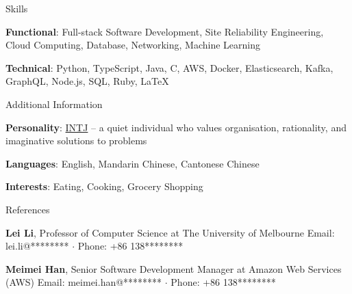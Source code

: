 \documentclass{xsha}
\begin{document}
\begin{xsection}{Skills}
\item \textbf{Functional}: Full-stack Software Development, Site Reliability Engineering, Cloud Computing, Database, Networking, Machine Learning
\item \textbf{Technical}: Python, TypeScript, Java, C, AWS, Docker, Elasticsearch, Kafka, GraphQL, Node.js, SQL, Ruby, \LaTeX
\end{xsection}

\begin{xsection}{Additional Information}
\item \textbf{Personality}: \href{https://www.16personalities.com/intj-personality}{INTJ} -- a quiet individual who values organisation, rationality, and imaginative solutions to problems
\item \textbf{Languages}: English, Mandarin Chinese, Cantonese Chinese
\item \textbf{Interests}: Eating, Cooking, Grocery Shopping
\end{xsection}

\begin{xsection}{References}
\item \textbf{Lei Li}, Professor of Computer Science at The University of Melbourne \newline
Email: lei.li@******** $\cdot$ Phone: +86 138********
\item \textbf{Meimei Han}, Senior Software Development Manager at Amazon Web Services (AWS) \newline
Email: meimei.han@******** $\cdot$ Phone: +86 138********
\end{xsection}
\end{document}
